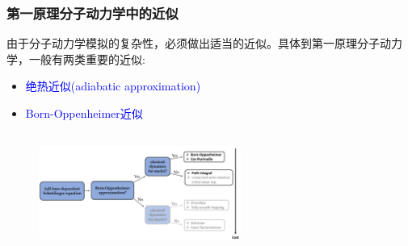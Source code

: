 {%
%
\frame
{
	\frametitle{第一原理分子动力学中的近似}
	由于分子动力学模拟的复杂性，必须做出适当的近似。具体到第一原理分子动力学，一般有两类重要的近似:
	\begin{itemize}
		\item \textcolor{blue}{绝热近似\textrm{(adiabatic approximation)}}\\
			{\fontsize{6.2pt}{4.2pt}\selectfont{假设电子-原子核在能量层面上完全分离，彼此间没有能量传递}}
		\item \textcolor{blue}{\textrm{Born-Oppenheimer}近似}\\
			{\fontsize{6.2pt}{4.2pt}}
	\end{itemize}
\begin{figure}[h!]
\centering
\vspace*{-0.25in}
\includegraphics[height=1.55in,width=2.6in,viewport=0 0 440 230,clip]{Figures/Molecular-dynamics_Claaified.png}
\label{Molecular-dynamics_Classified}
\end{figure}
}

}
